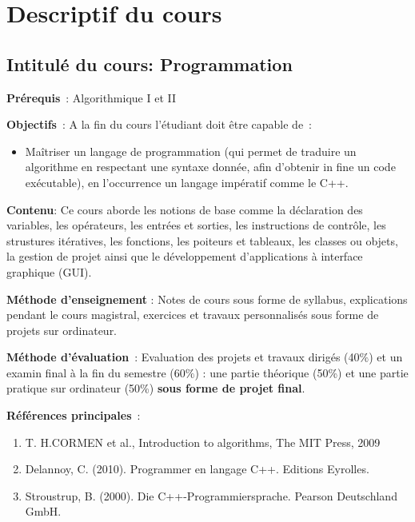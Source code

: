 \documentclass[a4paper, oneside,11pt]{book}
\begin{document}
\chapter*{Descriptif du cours}
\pagestyle{fancy}
\renewcommand{\chaptermark}[1]{\markboth{#1}{}}
 \rhead{}
\cfoot{\thepage}

\section*{Intitul\'e du cours: \textbf{Programmation}}





\textbf{Pr\'erequis} : Algorithmique I et II


\textbf{Objectifs} :  A la fin du cours l'\'etudiant doit \^etre capable de :
\begin{itemize}
\item Maîtriser un langage de programmation (qui permet de traduire un algorithme en respectant une syntaxe donn\'ee, afin d'obtenir in fine un code ex\'ecutable), 
en l'occurrence un langage imp\'eratif comme le C++. 

\end{itemize}
\textbf{Contenu}:
Ce cours aborde les notions de base comme la d\'eclaration des variables, les op\'erateurs, les entr\'ees et sorties, les instructions de contr\^ole, 
les strustures it\'eratives, les fonctions, les poiteurs et tableaux, les classes ou objets, la gestion de projet ainsi que le d\'eveloppement d'applications \`a interface 
graphique (GUI). 

\textbf{M\'ethode d'enseignement} : Notes de cours sous forme de syllabus, explications pendant le cours magistral, exercices et travaux personnalis\'es sous forme de projets 
sur ordinateur.

\textbf{M\'ethode d'\'evaluation} : Evaluation des projets et travaux dirig\'es (40$\%$)  et un examin final \`a la fin du semestre (60$\%$) : une partie th\'eorique (50\%) et une 
partie pratique sur ordinateur (50\%) \textbf{sous forme de projet final}.

\textbf{R\'ef\'erences principales} :

\begin{enumerate}
\item T. H.CORMEN et al., Introduction to algorithms, The MIT Press, 2009
\item Delannoy, C. (2010). Programmer en langage C++. Editions Eyrolles.
\item Stroustrup, B. (2000). Die C++-Programmiersprache. Pearson Deutschland GmbH.
\end{enumerate}
\end{document}
